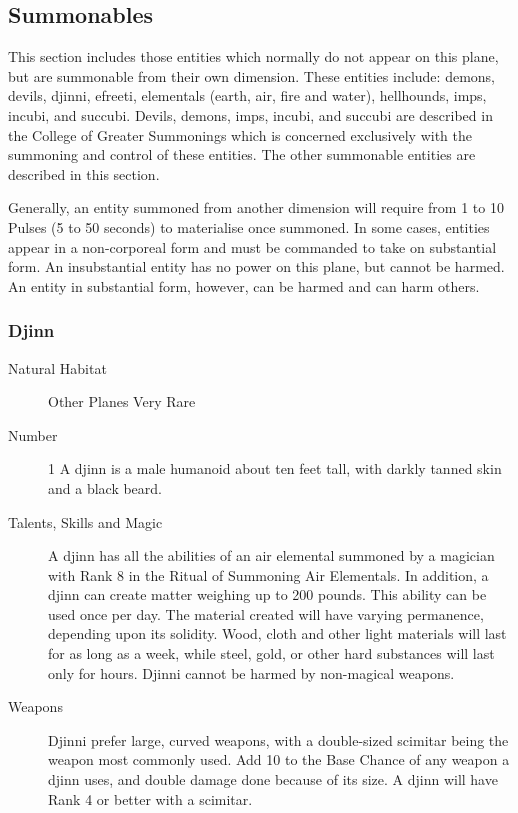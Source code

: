 \begin{multicols}{2}

\setlength\columnseprule{0.2mm}

\section{Summonables}
This section includes those entities which normally do not appear on
this plane, but are summonable from their own dimension.  These
entities include: demons, devils, djinni, efreeti, elementals (earth,
air, fire and water), hellhounds, imps, incubi, and succubi.  Devils,
demons, imps, incubi, and succubi are described in the College of
Greater Summonings which is concerned exclusively with the summoning
and control of these entities.  The other summonable entities are
described in this section.

Generally, an entity summoned from another dimension will require from
1 to 10 Pulses (5 to 50 seconds) to materialise once summoned.  In
some cases, entities appear in a non-corporeal form and must be
commanded to take on substantial form.  An insubstantial entity has no
power on this plane, but cannot be harmed. An entity in substantial
form, however, can be harmed and can harm others.


\subsubsection{Djinn}

\begin{description}
\item[Natural Habitat]  Other Planes Very Rare

\item[Number] 1
 A djinn is a male humanoid about ten feet tall, with
darkly tanned skin and a black beard.

\item[Talents, Skills and Magic] A djinn has all the abilities of an air elemental summoned
by a magician with Rank 8 in the Ritual of Summoning Air Elementals.
In addition, a djinn can create matter weighing up to 200 pounds.
This ability can be used once per day.  The material created will have
varying permanence, depending upon its solidity. Wood, cloth and other
light materials will last for as long as a week, while steel, gold, or
other hard substances will last only for hours. Djinni cannot be
harmed by non-magical weapons.

\item[Weapons] Djinni prefer large, curved weapons, with a double-sized
scimitar being the weapon most commonly used. Add 10 to the Base
Chance of any weapon a djinn uses, and double damage done because of
its size. A djinn will have Rank 4 or better with a scimitar.


\end{description}
\end{multicols}
